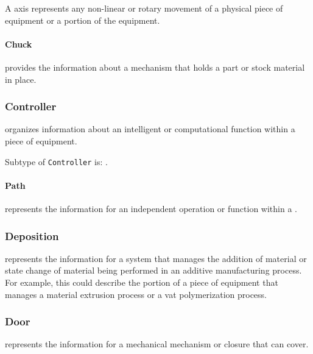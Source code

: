 A  axis represents any non-linear or rotary movement of a physical piece of equipment or a portion of the equipment.


\paragraph{Chuck}\mbox{}
\label{sec:Chuck}



 provides the information about a mechanism that holds a part or stock material in place.


\subsubsection{Controller}
\label{sec:Controller}



 organizes information about an intelligent or computational function within a piece of equipment.


Subtype of \texttt{Controller} is: .
\FloatBarrier

\paragraph{Path}\mbox{}
\label{sec:Path}



 represents the information for an independent operation or function within a .


\subsubsection{Deposition}
\label{sec:Deposition}



 represents the information for a system that manages the addition of material or state change of material being performed in an additive manufacturing process.  For example, this could describe the portion of a piece of equipment that manages a material extrusion process or a vat polymerization process.

\FloatBarrier

\subsubsection{Door}
\label{sec:Door}



 represents the information for a mechanical mechanism or closure that can cover.

